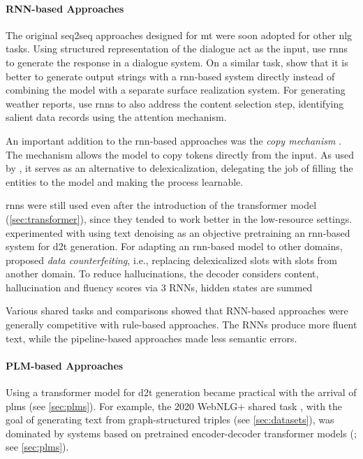 \paragraph{RNN-based Approaches} The original seq2seq approaches designed for \ac{mt} \cite{cho2014learning,sutskever2014sequence} were soon adopted for other \ac{nlg} tasks. Using structured representation of the dialogue act as the input, \citet{wen2015semantically} use \acp{rnn} to generate the response in a dialogue system. On a similar task, \citet{dusekSequencetoSequenceGenerationSpoken2016} show that it is better to generate output strings with a \ac{rnn}-based system directly instead of combining the model with a separate surface realization system. For generating weather reports, \citet{mei2016talk} use \acp{rnn} to also address the content selection step, identifying salient data records using the attention mechanism.

An important addition to the \ac{rnn}-based approaches was the \emph{copy mechanism} \cite{gu2016incorporating,seeGetPointSummarization2017}. The mechanism allows the model to copy tokens directly from the input. As used by \citet{gehrmannEndtoEndContentPlan2018}, it serves as an alternative to delexicalization, delegating the job of filling the entities to the model and making the process learnable.

\acp{rnn} were still used even after the introduction of the transformer model (\autoref{sec:transformer}), since they tended to work better in the low-resource settings. \citet{freitagUnsupervisedNaturalLanguage2018} experimented with using text denoising as an objective pretraining an \ac{rnn}-based system for \ac{d2t} generation. For adapting an \ac{rnn}-based model to other domains, \citet{wen2020recurrent} proposed \emph{data counterfeiting}, i.e., replacing delexicalized slots with slots from another domain. To reduce hallucinations, \citet{rebuffel2021controlling} the decoder considers content, hallucination and fluency scores via 3 RNNs, hidden states are summed

Various shared tasks and comparisons \cite{gardentWebNLGChallengeGenerating2017,dusekEvaluatingStateoftheartEndtoEnd2020,ferreiraNeuralDatatotextGeneration2019} showed that RNN-based approaches were generally competitive with rule-based approaches. The RNNs produce more fluent text, while the pipeline-based approaches made less semantic errors.


\paragraph{PLM-based Approaches} Using a transformer model for \ac{d2t} generation became practical with the arrival of \acp{plm} (see \autoref{sec:plms}). For example, the 2020 WebNLG+ shared task \cite{ferreira20202020}, with the goal of generating text from graph-structured triples (see \autoref{sec:datasets}), was dominated by systems based on pretrained encoder-decoder transformer models (\citealp{yang2020improving,agarwalMachineTranslationAided2020,kasnerTrainHardFinetune2020}; see \autoref{sec:plms}).


